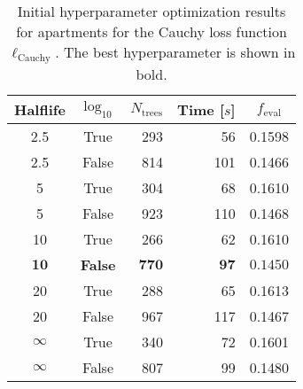 \begin{table}[h!]
  \centerfloat
  \begin{tabular}{@{}ccrrc@{}}
    Halflife & $\log_{10}$ & $N_\mathrm{trees}$ & Time [$s$] & $f_\mathrm{eval}$ \\
    \midrule
    \num{2.5} & True & \num{293} & \num{56} & \num{0.1598} \\
    \num{2.5} & False & \num{814} & \num{101} & \num{0.1466} \\
    \num{5} & True & \num{304} & \num{68} & \num{0.1610} \\
    \num{5} & False & \num{923} & \num{110} & \num{0.1468} \\
    \num{10} & True & \num{266} & \num{62} & \num{0.1610} \\
    $\mathbf{10}$ & \textbf{False} & $\mathbf{770}$ & $\mathbf{97}$ & $\mathbf{0.1450}$ \\
    \num{20} & True & \num{288} & \num{65} & \num{0.1613} \\
    \num{20} & False & \num{967} & \num{117} & \num{0.1467} \\
    $\infty$ & True & \num{340} & \num{72} & \num{0.1601} \\
    $\infty$ & False & \num{807} & \num{99} & \num{0.1480} \\
  \end{tabular}
  \caption[Initial Hyperparameter Optimization Results for Apartments -- Cauchy Loss Function]{\label{tab:h:HPO_initial_Cauchy-ejerlejlighed-appendix}Initial hyperparameter optimization results for apartments for the Cauchy loss function $\ell_\mathrm{Cauchy}$. The best hyperparameter is shown in bold.}
\end{table}


